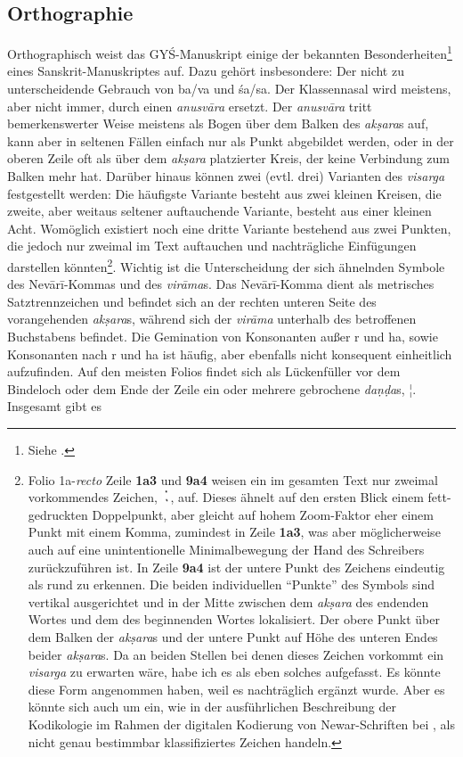 \documentclass[a4paper,12pt]{article}
\begin{document}
{\subsection{Orthographie}
Orthographisch weist das GYŚ-Manuskript einige der bekannten Besonderheiten\footnote{Siehe \parencite[vgl. xxix]{tomabechi2009}.} eines Sanskrit-Manuskriptes auf. Dazu gehört insbesondere: Der nicht zu unterscheidende Gebrauch von ba/va und śa/sa. Der Klassennasal wird meistens, aber nicht immer, durch einen \textit{anusvāra} ersetzt. Der \textit{anusvāra} tritt bemerkenswerter Weise meistens als Bogen über dem Balken des \textit{akṣara}s auf, kann aber in seltenen Fällen einfach nur als Punkt abgebildet werden, oder in der oberen Zeile oft als über dem \textit{akṣara} platzierter Kreis, der keine Verbindung zum Balken mehr hat. Darüber hinaus können zwei (evtl. drei) Varianten des \textit{visarga} festgestellt werden: Die häufigste Variante besteht aus zwei kleinen Kreisen, die zweite, aber weitaus seltener auftauchende Variante, besteht aus einer kleinen Acht. Womöglich existiert noch eine dritte Variante bestehend aus zwei Punkten, die jedoch nur zweimal im Text auftauchen und nachträgliche Einfügungen darstellen könnten\footnote{Folio 1a-\textit{recto} Zeile \textbf{1a3} und \textbf{9a4} weisen ein im gesamten Text nur zweimal vorkommendes Zeichen, \includegraphics[height=4.0mm]{zeichenx.png}, auf. Dieses ähnelt auf den ersten Blick einem fett-gedruckten Doppelpunkt, aber gleicht auf hohem Zoom-Faktor eher einem Punkt mit einem Komma, zumindest in Zeile \textbf{1a3}, was aber möglicherweise auch auf eine unintentionelle Minimalbewegung der Hand des Schreibers zurückzuführen ist. In Zeile \textbf{9a4} ist der untere Punkt des Zeichens eindeutig als rund zu erkennen. Die beiden individuellen ``Punkte'' des Symbols sind vertikal ausgerichtet und in der Mitte zwischen dem \textit{akṣara} des endenden Wortes und dem des beginnenden Wortes lokalisiert. Der obere Punkt über dem Balken der \textit{akṣara}s und der untere Punkt auf Höhe des unteren Endes beider \textit{akṣara}s. Da an beiden Stellen bei denen dieses Zeichen vorkommt ein \textit{visarga} zu erwarten wäre, habe ich es als eben solches aufgefasst. Es könnte diese Form angenommen haben, weil es nachträglich ergänzt wurde. Aber es könnte sich auch um ein, wie in der ausführlichen Beschreibung der Kodikologie im Rahmen der digitalen Kodierung von Newar-Schriften bei \parencite[18]{arbor2012}, als nicht genau bestimmbar klassifiziertes Zeichen handeln.}. Wichtig ist die Unterscheidung der sich ähnelnden Symbole des Nevārī-Kommas \parencite[16]{arbor2012} und des \textit{virāma}s. Das Nevārī-Komma dient als metrisches Satztrennzeichen und befindet sich an der rechten unteren Seite des vorangehenden \textit{akṣara}s, während sich der \textit{virāma} unterhalb des betroffenen Buchstabens befindet. Die Gemination von Konsonanten außer r und ha, sowie Konsonanten nach r und ha ist häufig, aber ebenfalls nicht konsequent einheitlich aufzufinden. Auf den meisten Folios findet sich als Lückenfüller vor dem Bindeloch oder dem Ende der Zeile ein oder mehrere gebrochene \textit{daṇḍa}s, ¦. Insgesamt gibt es }
\end{document}
